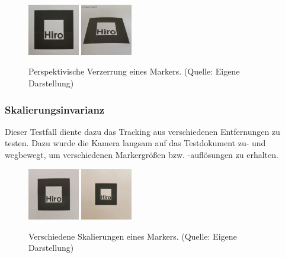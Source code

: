 \begin{figure}[H]
	\centering
    \includegraphics[width=0.2\textwidth]{Abbildungen/Invarianz/Perspektive1.jpg}
    \includegraphics[width=0.2\textwidth]{Abbildungen/Invarianz/Perspektive2.jpg}
    \caption[Perspektiven eines Markers]{Perspektivische Verzerrung eines Markers. (Quelle: Eigene Darstellung)}
\end{figure}

\subsubsection{Skalierungsinvarianz} Dieser Testfall diente dazu das Tracking aus verschiedenen Entfernungen zu testen. Dazu wurde die Kamera langsam auf das Testdokument zu- und wegbewegt, um verschiedenen Markergrößen bzw. -auflösungen zu erhalten.

\begin{figure}[H]
    \centering
    \includegraphics[width=0.2\textwidth]{Abbildungen/Invarianz/Skalierung1.jpg}
    \includegraphics[width=0.2\textwidth]{Abbildungen/Invarianz/Skalierung2.jpg}
    \caption[Skalierungen eines Markers]{Verschiedene Skalierungen eines Markers. (Quelle: Eigene Darstellung)}
\end{figure}

